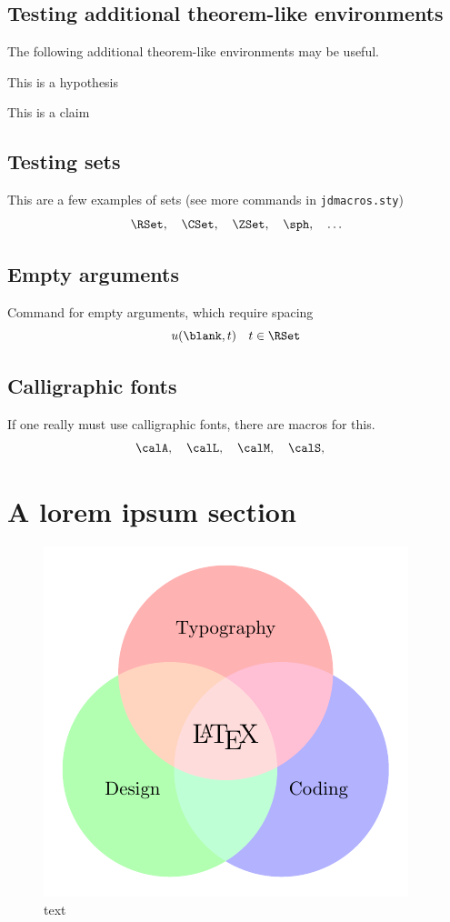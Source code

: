 \documentclass[a4paper]{siamart190516}
\begin{document}
\subsection{Testing additional theorem-like environments} The following additional
theorem-like environments may be useful.

\begin{hypothesis} \label{hyp:trivial}
  This is a hypothesis
\end{hypothesis}

\begin{claim} \label{clm:trivial}
  This is a claim
\end{claim}

\subsection{Testing sets}
This are a few examples of sets (see more commands in \texttt{jdmacros.sty})
\[
  \RSet, \quad
  \CSet, \quad
  \ZSet, \quad
  \sph, \quad
  \ldots
\]

\subsection{Empty arguments}
Command for empty arguments, which require spacing
\[
  u(\blank,t) \quad t \in \RSet
\]

\subsection{Calligraphic fonts}
If one really must use calligraphic fonts, there are macros for this.
\[
  \calA, \quad
  \calL, \quad
  \calM, \quad
  \calS, \quad
\]

\section{A lorem ipsum section}\label{sec:lorem} 
\begin{figure}
  \centering
  \includegraphics{venn}
  \caption{text}
  \label{fig:label}
\end{figure}
\lipsum[1-10]




\end{document}
